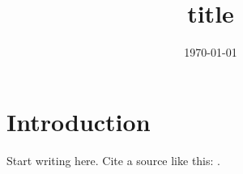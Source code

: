 \documentclass[11pt,a4paper]{article}
\title{{{title}}}
\author{}
\date{\today}
\begin{document}
\maketitle

\section{Introduction}

Start writing here. Cite a source like this: \cite{knuth1984}.



\end{document}
